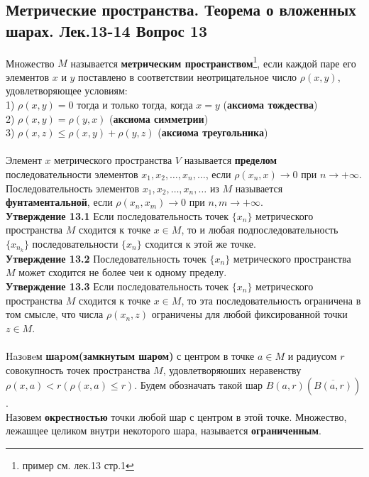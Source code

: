 \documentclass{article}
\begin{document}
\subsection{Метрические пространства. Теорема о вложенных шарах. 	Лек.13-14 \textbf{Вопрос 13}}
	Множество $M$ называется \textbf{метрическим пространством}\footnote{пример см. лек.13 стр.1}, если каждой паре его элементов $x$ и $y$ поставлено в соответствии неотрицательное число $\rho(x,y)$, удовлетворяющее условиям:\\
	1) $\rho(x,y)=0$ тогда и только тогда, когда $x=y$ (\textbf{аксиома тождества})\\
	2) $\rho(x,y)=\rho(y,x)$ (\textbf{аксиома симметрии})\\
	3) $\rho(x,z)\le \rho(x,y)+\rho(y,z)$ (\textbf{аксиома треугольника})\\
	\\
	Элемент $x$ метрического пространства $V$ называется \textbf{пределом} последовательности элементов ${x}_{1},{x}_{2},\ldots,{x}_{n},\ldots$, если $\rho({x}_{n},x)\rightarrow0$ при $n\rightarrow +\infty$. Последовательность элементов ${x}_{1},{x}_{2},\ldots,{x}_{n},\ldots$ из $M$ называется \textbf{фунтаментальной}, если $\rho({x}_{n},{x}_{m})\rightarrow0$ при $n,m\rightarrow +\infty$.\\
	\textbf{Утверждение 13.1} Если последовательность точек $\{{x}_{n}\}$ метрического пространства $M$ сходится к точке $x\in M$, то и любая подпоследовательность $\{{x}_{{n}_{k}}\}$ последовательности $\{{x}_{n}\}$ сходится к этой же точке.\\
	\textbf{Утверждение 13.2} Последовательность точек $\{{x}_{n}\}$ метрического пространства $M$ может сходится не более чеи к одному  пределу.\\
	\textbf{Утверждение 13.3} Если последовательность точек $\{{x}_{n}\}$ метрического пространства $M$ сходится к точке $x\in M$, то эта последовательность ограничена в том смысле, что числа $\rho({x}_{n},z)$ ограничены для любой фиксированной точки $z\in M$.\\
	\\
	Haзoвeм \textbf{шapoм(замкнутым шаром)} с центром в точке $a\in M$ и радиусом $r$ совокупность точек пространства $M$, удовлетворяюших неравенству $\rho(x,a)<r(\rho(x,a)\le r)$. Будем обозначать такой шар $B(a,r)(\overline{B(a,r)})$. \\
	Назовем \textbf{окрестностью} точки любой шар с центром в этой точке. Множество, лежашцее целиком внутри некоторого шара, называется \textbf{ограниченным}.\\
\end{document}
